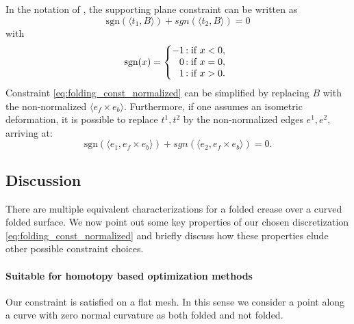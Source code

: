 In the notation of , the supporting plane constraint can be written as
\begin{equation} \label{eq:folding_const_normalized} 
\text{sgn}(\langle t_1,B\rangle) +  {sgn}(\langle t_2,B\rangle) = 0
\end{equation}
with 
\begin{equation} \label{eq:sign}
\text{sgn}(x) = \left\{
     \begin{array}{@{}r@{\thinspace}l}
       -1  &: \text{if } x < 0, \\
       0 &: \text{if } x = 0, \\
       1 &: \text{if } x > 0. \\
     \end{array}
   \right.
\end{equation}
%
Constraint \eqref{eq:folding_const_normalized} can be simplified by replacing $B$ with the non-normalized $\langle e_f \times e_b \rangle$. Furthermore, if one assumes an isometric deformation, it is possible to replace $t^1,t^2$ by the non-normalized edges $e^1,e^2$, arriving at:
\begin{equation} \label{eq:folding_const}
\text{sgn}(\langle e_1,e_f \times e_b \rangle) +  {sgn}(\langle e_2,e_f \times e_b\rangle) = 0.
\end{equation}
%

\subsection{Discussion}
There are multiple equivalent characterizations for a folded crease over a curved folded surface. We now point out some key properties of our chosen discretization \eqref{eq:folding_const_normalized} and briefly discuss how these properties elude other possible constraint choices.

\paragraph{Suitable for homotopy based optimization methods} 
Our constraint is satisfied on a flat mesh. In this sense we consider a point along a curve with zero normal curvature as both folded and not folded.
 
